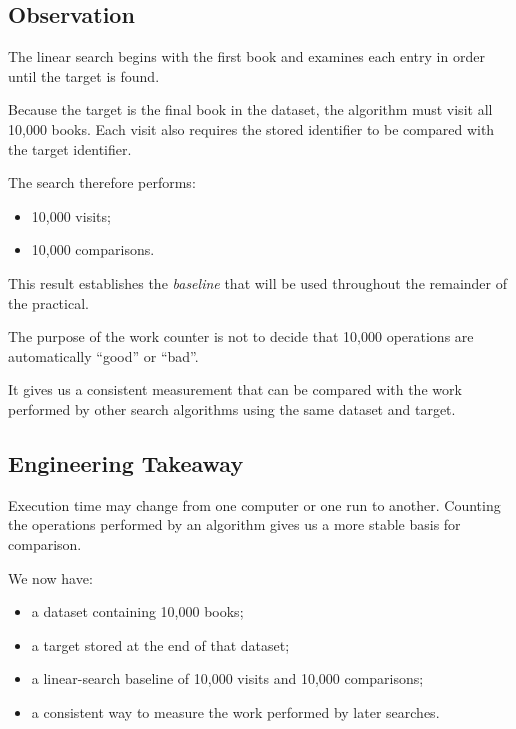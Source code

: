 \documentclass{csc2059practical}
\begin{document}

\subsection{Observation}

The linear search begins with the first book and examines each entry in order
until the target is found.

Because the target is the final book in the dataset, the algorithm must visit
all 10,000 books. Each visit also requires the stored identifier to be compared
with the target identifier.

The search therefore performs:

\begin{itemize}
    \item 10,000 visits;
    \item 10,000 comparisons.
\end{itemize}

This result establishes the \emph{baseline} that will be used throughout the
remainder of the practical.

\begin{importantnote}
The purpose of the work counter is not to decide that 10,000 operations are
automatically ``good'' or ``bad''.

It gives us a consistent measurement that can be compared with the work
performed by other search algorithms using the same dataset and target.
\end{importantnote}


\subsection{Engineering Takeaway}

Execution time may change from one computer or one run to another. Counting the
operations performed by an algorithm gives us a more stable basis for comparison.

We now have:

\begin{itemize}
    \item a dataset containing 10,000 books;
    \item a target stored at the end of that dataset;
    \item a linear-search baseline of 10,000 visits and 10,000 comparisons;
    \item a consistent way to measure the work performed by later searches.
\end{itemize}
\end{document}
